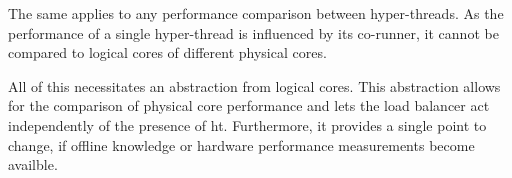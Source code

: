 The same applies to any performance comparison between hyper-threads. As the
performance of a single hyper-thread is influenced by its co-runner, it cannot
be compared to logical cores of different physical cores.

All of this necessitates an abstraction from logical cores.
This abstraction allows for the comparison of physical core performance and
lets the load balancer act independently of the presence of \gls{ht}.
Furthermore, it provides a single point to change, if offline knowledge or
hardware performance measurements become availble.
